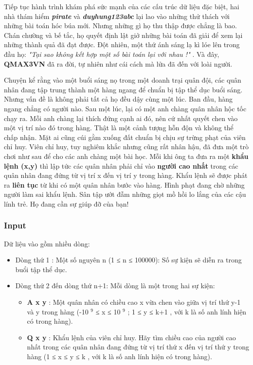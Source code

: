 







   Tiếp tục hành trình khám phá sức mạnh của các cấu trúc dữ liệu đặc biệt, hai nhà thám hiểm   \textbf{\emph{     pirate    }}   và   \textbf{\emph{     duyhung123abc    }}   lại lao vào những thử thách với những bài toán hóc búa mới. Nhưng những gì họ thu thập được chẳng là bao. Chán chường và bế tắc, họ quyết định lật giở những bài toán đã giải để xem lại những thành quả đã đạt được. Đột nhiên, một thứ ánh sáng lạ kì lóe lên trong đầu họ:   \emph{    "Tại sao không kết hợp một số bài toán lại với nhau !"   }   . Và đây,   \textbf{    QMAX3VN   }   đã ra đời, tự nhiên như cái cách mà lửa đã đến với loài người.  

   Chuyện kể rằng vào một buổi sáng nọ trong một doanh trại quân đội, các quân nhân đang tập trung thành một hàng ngang để chuẩn bị tập thể dục buổi sáng. Nhưng vấn đề là không phải tất cả họ đều dậy cùng một lúc. Ban đầu, hàng ngang chẳng có người nào. Sau một lúc, lại có một anh chàng quân nhân hộc tốc chạy ra. Mỗi anh chàng lại thích đứng cạnh ai đó, nên cứ nhất quyết chen vào một vị trí nào đó trong hàng. Thật là một cảnh tượng hỗn độn và không thể chấp nhận. Mặt ai cũng cúi gằm xuống đất chuẩn bị chịu sự trừng phạt của viên chỉ huy. Viên chỉ huy, tuy nghiêm khắc nhưng cũng rất nhân hậu, đã đưa một trò chơi như sau để cho các anh chàng một bài học. Mỗi khi ông ta đưa ra một   \textbf{    khẩu lệnh (x,y)   }   thì lập tức các quân nhân phải chỉ vào   \textbf{    người cao nhất   }   trong các quân nhân đang đứng từ vị trí x đến vị trí y trong hàng. Khẩu lệnh sẽ được phát ra   \textbf{    liên tục   }   từ khi có một quân nhân bước vào hàng. Hình phạt đang chờ những người làm sai khẩu lệnh. Sân tập ướt đẫm những giọt mồ hồi lo lắng của các cậu lính trẻ. Họ đang cần sự giúp đỡ của bạn!  

\subsubsection{   Input  }

   Dữ liệu vào gồm nhiều dòng:  
\begin{itemize}
	\item     Dòng thứ 1 : Một số nguyên n (1 ≤ n ≤ 100000): Số sự kiện sẽ diễn ra trong buổi tập thể dục.   
	\item     Dòng thứ 2 đến dòng thứ n+1: Mỗi dòng là một trong hai sự kiện:    
\begin{itemize}
	\item \textbf{       A x y      }      : Một quân nhân có chiều cao x vừa chen vào giữa vị trí thứ y-1 và y trong hàng (-10      $^       9      $      ≤ x ≤ 10      $^       9      $      ; 1 ≤ y ≤ k+1 , với k là số anh lính hiện có trong hàng).     
	\item \textbf{       Q x y      }      : Khẩu lệnh của viên chỉ huy. Hãy tìm chiều cao của người cao nhất trong các quân nhân đang đứng từ vị trí thứ x đến vị trí thứ y trong hàng (1 ≤ x ≤ y ≤ k , với k là số anh lính hiện có trong hàng).     
\end{itemize}
\end{itemize}



